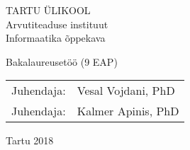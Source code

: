 \documentclass[../thesis.tex]{subfiles}
\begin{document}
\thispagestyle{empty}
\begin{center}

\large
TARTU ÜLIKOOL\\
Arvutiteaduse instituut\\
Informaatika õppekava\\%

\vspace{25mm}

\Large \myauthor

\vspace{4mm}

\huge \mytitle

\vspace{20mm}

\Large Bakalaureusetöö (9 EAP)

\end{center}

\vspace{2mm}

\begin{flushright}
 {
 \setlength{\extrarowheight}{5pt}
 \begin{tabular}{r l} 
  \sffamily Juhendaja: & \sffamily Vesal Vojdani, PhD \\
  \sffamily Juhendaja: & \sffamily Kalmer Apinis, PhD
 \end{tabular}
 }
\end{flushright}


\vfill
\centerline{Tartu 2018}
\end{document}

